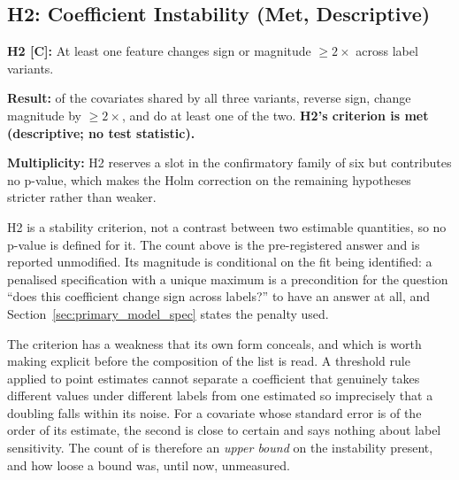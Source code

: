 \subsection{H2: Coefficient Instability (Met, Descriptive)}
\label{sec:h2}

\begin{mdframed}[backgroundcolor=ATUSand!30, linecolor=ATUGreen]
    \textbf{H2 [C]:} At least one feature changes sign or magnitude
    $\geq 2\times$ across label variants.

    \textbf{Result:} of the \pcHTwoNTerms{} covariates shared by all three
    variants, \pcHTwoNSign{} reverse sign, \pcHTwoNMag{} change magnitude by
    $\geq 2\times$, and \pcHTwoEst{} do at least one of the two.
    \textbf{H2's criterion is met (descriptive; no test statistic).}

    \textbf{Multiplicity:} H2 reserves a slot in the confirmatory family of six
    but contributes no p-value, which makes the Holm correction on the
    remaining hypotheses stricter rather than weaker.
\end{mdframed}

H2 is a stability criterion, not a contrast between two estimable quantities,
so no p-value is defined for it. The count above is the pre-registered answer
and is reported unmodified. Its magnitude is conditional on the fit being
identified: a penalised specification with a unique maximum is a precondition
for the question ``does this coefficient change sign across labels?'' to have
an answer at all, and Section~\ref{sec:primary_model_spec} states the penalty
used.

The criterion has a weakness that its own form conceals, and which is worth
making explicit before the composition of the list is read. A threshold rule
applied to point estimates cannot separate a coefficient that genuinely takes
different values under different labels from one estimated so imprecisely that
a doubling falls within its noise. For a covariate whose standard error is of
the order of its estimate, the second is close to certain and says nothing
about label sensitivity. The count of \pcHTwoEst{} is therefore an
\emph{upper bound} on the instability present, and how loose a bound was, until
now, unmeasured.

